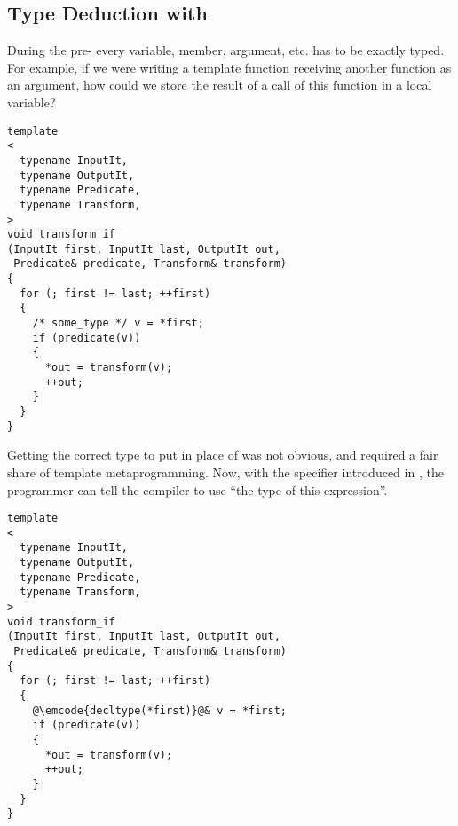 \subsection{Type Deduction with }
\label{decltype}

During the pre- every variable, member, argument, etc. has to be
exactly typed. For example, if we were writing a template function
receiving another function as an argument, how could we store the
result of a call of this function in a local variable?

\begin{lstlisting}
template
<
  typename InputIt,
  typename OutputIt,
  typename Predicate,
  typename Transform,
>
void transform_if
(InputIt first, InputIt last, OutputIt out,
 Predicate& predicate, Transform& transform)
{
  for (; first != last; ++first)
  {
    /* some_type */ v = *first;
    if (predicate(v))
    {
      *out = transform(v);
      ++out;
    }
  }
}
\end{lstlisting}

Getting the correct type to put in place of  was not
obvious, and required a fair share of template metaprogramming. Now,
with the  specifier introduced in , the
programmer can tell the compiler to use ``the type of this
expression''.


\begin{lstlisting}
template
<
  typename InputIt,
  typename OutputIt,
  typename Predicate,
  typename Transform,
>
void transform_if
(InputIt first, InputIt last, OutputIt out,
 Predicate& predicate, Transform& transform)
{
  for (; first != last; ++first)
  {
    @\emcode{decltype(*first)}@& v = *first;
    if (predicate(v))
    {
      *out = transform(v);
      ++out;
    }
  }
}
\end{lstlisting}
